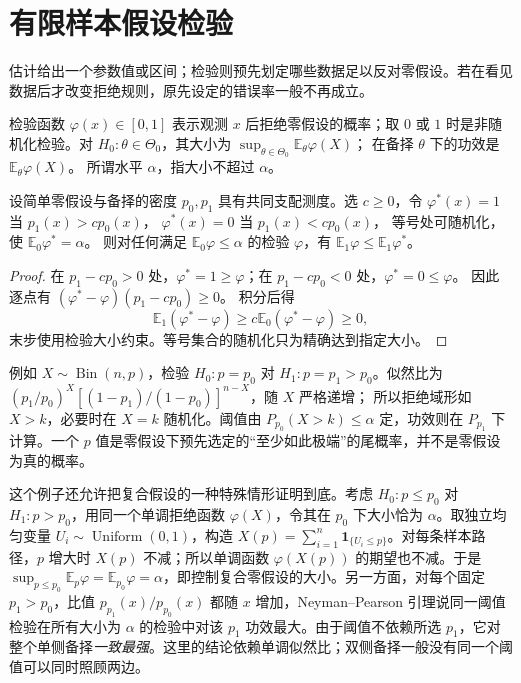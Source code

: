 \section{有限样本假设检验}

估计给出一个参数值或区间；检验则预先划定哪些数据足以反对零假设。若在看见数据后才改变拒绝规则，原先设定的错误率一般不再成立。

\begin{definition}[检验、大小与功效]
检验函数 \(\varphi(x)\in[0,1]\) 表示观测 \(x\) 后拒绝零假设的概率；取 \(0\) 或 \(1\) 时是非随机化检验。对 \(H_0:\theta\in\Theta_0\)，其大小为
\(\sup_{\theta\in\Theta_0}\mathbb E_\theta\varphi(X)\)；
在备择 \(\theta\) 下的功效是 \(\mathbb E_\theta\varphi(X)\)。
所谓水平 \(\alpha\)，指大小不超过 \(\alpha\)。
\end{definition}

\begin{theorem}
设简单零假设与备择的密度 \(p_0,p_1\) 具有共同支配测度。选 \(c\ge0\)，令
\(\varphi^*(x)=1\) 当 \(p_1(x)>cp_0(x)\)，
\(\varphi^*(x)=0\) 当 \(p_1(x)<cp_0(x)\)，
等号处可随机化，使 \(\mathbb E_0\varphi^*=\alpha\)。
则对任何满足 \(\mathbb E_0\varphi\le\alpha\) 的检验 \(\varphi\)，有
\(\mathbb E_1\varphi\le\mathbb E_1\varphi^*\)。
\end{theorem}
\begin{proof}
在 \(p_1-cp_0>0\) 处，\(\varphi^*=1\ge\varphi\)；在
\(p_1-cp_0<0\) 处，\(\varphi^*=0\le\varphi\)。
因此逐点有
\((\varphi^*-\varphi)(p_1-cp_0)\ge0\)。
积分后得
\[
\mathbb E_1(\varphi^*-\varphi)
\ge c\mathbb E_0(\varphi^*-\varphi)
\ge0,
\]
末步使用检验大小约束。等号集合的随机化只为精确达到指定大小。
\end{proof}

例如 \(X\sim\operatorname{Bin}(n,p)\)，检验
\(H_0:p=p_0\) 对 \(H_1:p=p_1>p_0\)。似然比为
\((p_1/p_0)^X[(1-p_1)/(1-p_0)]^{n-X}\)，随 \(X\) 严格递增；
所以拒绝域形如 \(X>k\)，必要时在 \(X=k\) 随机化。阈值由
\(P_{p_0}(X>k)\le\alpha\) 定，功效则在 \(P_{p_1}\) 下计算。一个 \(p\) 值是零假设下预先选定的“至少如此极端”的尾概率，并不是零假设为真的概率。

这个例子还允许把复合假设的一种特殊情形证明到底。考虑
\(H_0:p\le p_0\) 对 \(H_1:p>p_0\)，用同一个单调拒绝函数
\(\varphi(X)\)，令其在 \(p_0\) 下大小恰为 \(\alpha\)。取独立均匀变量 \(U_i\sim\operatorname{Uniform}(0,1)\)，构造
\(X(p)=\sum_{i=1}^n\mathbf1_{\{U_i\le p\}}\)。对每条样本路径，\(p\) 增大时 \(X(p)\) 不减；所以单调函数
\(\varphi(X(p))\) 的期望也不减。于是
\(\sup_{p\le p_0}\mathbb E_p\varphi=\mathbb E_{p_0}\varphi=\alpha\)，即控制复合零假设的大小。另一方面，对每个固定 \(p_1>p_0\)，比值
\(p_{p_1}(x)/p_{p_0}(x)\) 都随 \(x\) 增加，Neyman--Pearson 引理说同一阈值检验在所有大小为 \(\alpha\) 的检验中对该 \(p_1\) 功效最大。由于阈值不依赖所选 \(p_1\)，它对整个单侧备择\emph{一致最强}。这里的结论依赖单调似然比；双侧备择一般没有同一个阈值可以同时照顾两边。

